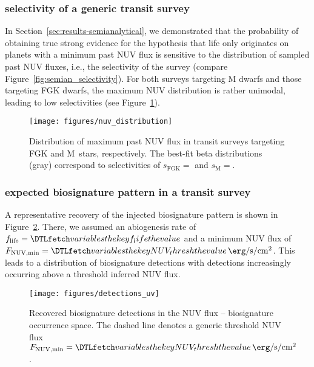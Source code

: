 \documentclass[modern,linenumbers]{aastex631}
\begin{document}
\subsubsection{selectivity of a generic transit survey}
In Section~\ref{sec:results-semianalytical}, we demonstrated that the probability of obtaining true strong evidence for the hypothesis that life only originates on planets with a minimum past \gls{NUV} flux is sensitive to the distribution of sampled past \gls{NUV} fluxes, i.e., the selectivity of the survey (compare Figure~\ref{fig:semian_selectivity}).
For both surveys targeting M dwarfs and those targeting FGK dwarfs, the maximum \gls{NUV} distribution is rather unimodal, leading to low selectivities (see Figure~\ref{fig:nuv_distribution}).
\begin{figure}
    \begin{centering}
        \texttt{[image: figures/nuv\_distribution]}
        \caption{Distribution of maximum past \gls{NUV} flux in transit surveys targeting FGK and M~stars, respectively. The best-fit beta distributions (gray) correspond to selectivities of $s_\mathrm{FGK} = $ and $s_\mathrm{M} = $.}
        \label{fig:nuv_distribution}
    \end{centering}
\end{figure}


\subsubsection{expected biosignature pattern in a transit survey}
A representative recovery of the injected biosignature pattern is shown in Figure~\ref{fig:detections_uv}.
There, we assumed an abiogenesis rate of $f_\mathrm{life} = \var{f_life}$ and a minimum \gls{NUV} flux of $F_\mathrm{NUV, min} = \var{NUV_thresh}\,\SI{}{\erg\per\second\per\centi\meter\squared}$.
This leads to a distribution of biosignature detections with detections increasingly occurring above a threshold inferred NUV flux.
\begin{figure}
    \begin{centering}
        \texttt{[image: figures/detections\_uv]}
        \caption{Recovered biosignature detections in the \gls{NUV} flux -- biosignature occurrence space. The dashed line denotes a generic threshold \gls{NUV} flux $F_\mathrm{NUV, min} = \var{NUV_thresh}\,\SI{}{\erg\per\second\per\centi\meter\squared}$.}
        \label{fig:detections_uv}
    \end{centering}
\end{figure}
\end{document}
